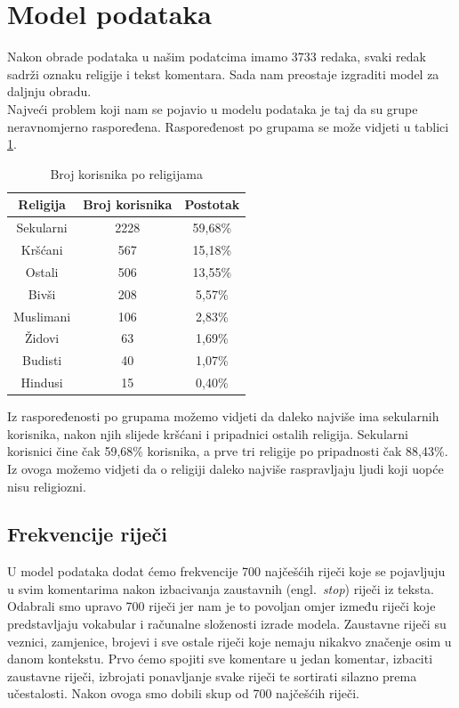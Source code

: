 \documentclass[times,utf8,zavrsni]{fer}
\begin{document}
\newpage
\section{Model podataka}
Nakon obrade podataka u našim podatcima imamo 3733 redaka, svaki redak sadrži oznaku religije i tekst komentara. Sada nam preostaje izgraditi model za daljnju obradu. \\

Najveći problem koji nam se pojavio u modelu podataka je taj da su grupe neravnomjerno raspoređena. Raspoređenost po grupama se može vidjeti u tablici \ref{table:dist}. \\

\begin{table}[h!]
\centering
\caption{Broj korisnika po religijama}
\label{table:dist}
\begin{tabular}{@{}ccc@{}}
\hline
Religija  & Broj korisnika & Postotak \\ 
\hline
\hline
Sekularni & 2228  &  59,68\%                 \\
Kršćani   & 567   & 15,18\%                 \\
Ostali    & 506  & 13,55\% \\
Bivši     & 208  & 5,57\%                   \\
Muslimani & 106  & 2,83\%                   \\
Židovi    & 63   & 1,69\%                  \\
Budisti   & 40   & 1,07\%                  \\
Hindusi   & 15  & 0,40\%                 \\
\hline
\end{tabular}
\end{table}

Iz raspoređenosti po grupama možemo vidjeti da daleko najviše ima sekularnih korisnika, nakon njih slijede kršćani i pripadnici ostalih religija. Sekularni korisnici čine čak 59,68\% korisnika, a prve tri religije po pripadnosti čak 88,43\%. Iz ovoga možemo vidjeti da o religiji daleko najviše raspravljaju ljudi koji uopće nisu religiozni. \\

%
\subsection{Frekvencije riječi}
U model podataka dodat ćemo frekvencije 700 najčešćih riječi koje se pojavljuju u svim komentarima nakon izbacivanja zaustavnih (engl.~\emph{stop}) riječi iz teksta. Odabrali smo upravo 700 riječi jer nam je to povoljan omjer između riječi koje predstavljaju vokabular i računalne složenosti izrade modela. Zaustavne riječi su veznici, zamjenice, brojevi i sve ostale riječi koje nemaju nikakvo značenje osim u danom kontekstu. Prvo ćemo spojiti sve komentare u jedan komentar, izbaciti zaustavne riječi, izbrojati ponavljanje svake riječi te sortirati silazno prema učestalosti. Nakon ovoga smo dobili skup od 700 najčešćih riječi. \\ 
\end{document}
